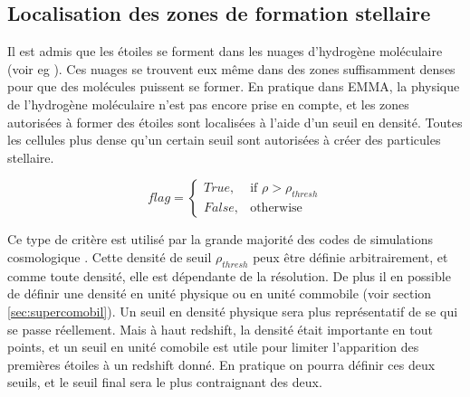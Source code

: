 %




\subsection{Localisation des zones de formation stellaire}

Il est admis que les étoiles se forment dans les nuages d'hydrogène moléculaire (voir eg \cite{krumholz_universal_2012}).
Ces nuages se trouvent eux même dans des zones suffisamment denses pour que des molécules puissent se former.
En pratique dans EMMA, la physique de l'hydrogène moléculaire n'est pas encore prise en compte, et les zones autorisées à former des étoiles sont localisées à l'aide d'un seuil en densité.
Toutes les cellules plus dense qu'un certain seuil sont autorisées à créer des particules stellaire.

\begin{equation}
	flag = 
  \begin{cases}
      True, & \text{if } \rho > \rho_{thresh}\\
      False,              & \text{otherwise}
  \end{cases}
\end{equation} 

Ce type de critère est utilisé par la grande majorité des codes de simulations cosmologique \citep{kay_including_2002}.
Cette densité de seuil $\rho_{thresh}$ peux être définie arbitrairement, et comme toute densité, elle est dépendante de la résolution.
De plus il en possible de définir une densité en unité physique ou en unité commobile (voir section \ref{sec:supercomobil}).
Un seuil en densité physique sera plus représentatif de se qui se passe réellement.
Mais à haut redshift, la densité était importante en tout points, et un seuil en unité comobile est utile pour limiter l'apparition des premières étoiles à un redshift donné.
En pratique on pourra définir ces deux seuils, et le seuil final sera le plus contraignant des deux.

